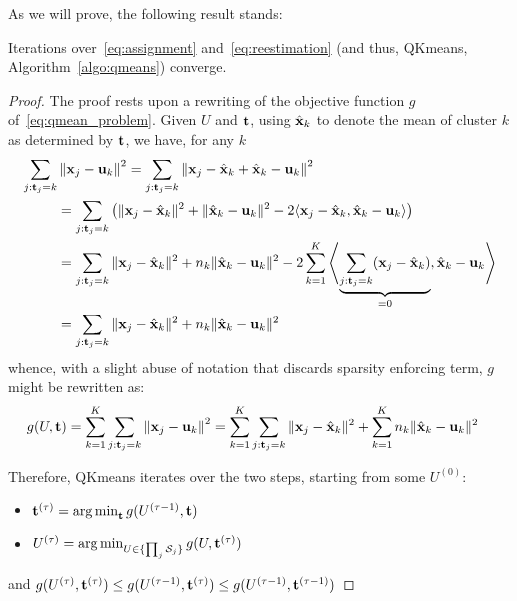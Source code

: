 

As we will prove, the following result stands:
\begin{proposition}
Iterations over~\eqref{eq:assignment} and~\eqref{eq:reestimation} (and thus, QKmeans, Algorithm~\ref{algo:qmeans}) converge. 
\end{proposition}
\begin{proof}
	The proof rests upon a rewriting of the objective function $g$ of~\eqref{eq:qmean_problem}. Given $U$ and ${\mathbf{t}}$, using $\hat{{\mathbf{x}}}_k$ to denote
	the mean of cluster $k$ as determined by ${\mathbf{t}}$, we have, for any $k$
\begin{align*}
	\sum_{j: {\mathbf{t}}_j = k} &\left\|{\mathbf{x}}_j -{\mathbf{u}}_k\right\|^2
	=\sum_{j: {\mathbf{t}}_j = k} \left\|{\mathbf{x}}_j -\hat{{\mathbf{x}}}_k+\hat{{\mathbf{x}}}_k-{\mathbf{u}}_k\right\|^2\\
	& = \sum_{j: {\mathbf{t}}_j = k}\left(\|{\mathbf{x}}_j-\hat{{\mathbf{x}}}_k\|^2+\|\hat{{\mathbf{x}}}_k-{\mathbf{u}}_k\|^2-2\langle{\mathbf{x}}_j-\hat{{\mathbf{x}}}_k,\hat{{\mathbf{x}}}_k-{\mathbf{u}}_k\rangle\right)\notag\\
	& = \sum_{j: {\mathbf{t}}_j = k}\|{\mathbf{x}}_j-\hat{{\mathbf{x}}}_k\|^2+n_k\|\hat{{\mathbf{x}}}_k-{\mathbf{u}}_k\|^2- 2\sum_{k=1}^{K}\left\langle\underbrace{\sum_{j: {\mathbf{t}}_j = k}({\mathbf{x}}_j-\hat{{\mathbf{x}}}_k)}_{=0},\hat{{\mathbf{x}}}_k-{\mathbf{u}}_k\right\rangle\notag\\
	&= \sum_{j: {\mathbf{t}}_j = k}\|{\mathbf{x}}_j-\hat{{\mathbf{x}}}_k\|^2 + n_k\|\hat{{\mathbf{x}}}_k-{\mathbf{u}}_k\|^2
\end{align*}
whence, with a slight abuse of notation that discards
sparsity enforcing term, $g$ might be rewritten as:
\begin{align}
	g(U,{\mathbf{t}})&=\sum_{k=1}^K\sum_{j: {\mathbf{t}}_j = k}\left\|{\mathbf{x}}_j -{\mathbf{u}}_k\right\|^2=\sum_{k=1}^K\sum_{j: {\mathbf{t}}_j = k}\|{\mathbf{x}}_j-\hat{{\mathbf{x}}}_k\|^2 + \sum_{k=1}^Kn_k\|\hat{{\mathbf{x}}}_k-{\mathbf{u}}_k\|^2
\end{align}

Therefore, QKmeans iterates over the two steps, starting from some $U^{(0)}$:
\begin{itemize}
	\item ${\mathbf{t}}^{(\tau)} = \operatorname*{arg\,min}_{\mathbf{t}} g(U^{(\tau-1)},{\mathbf{t}})$
	\item $U^{(\tau)}=\operatorname*{arg\,min}_{U\in\{\prod_j\mathcal{S}_j\}}g(U,{\mathbf{t}}^{(\tau)})$
\end{itemize}
and $g(U^{(\tau)},{\mathbf{t}}^{(\tau)})\leq g(U^{(\tau-1)},{\mathbf{t}}^{(\tau)})\leq g(U^{(\tau-1)},{\mathbf{t}}^{(\tau-1)})$
\end{proof}

